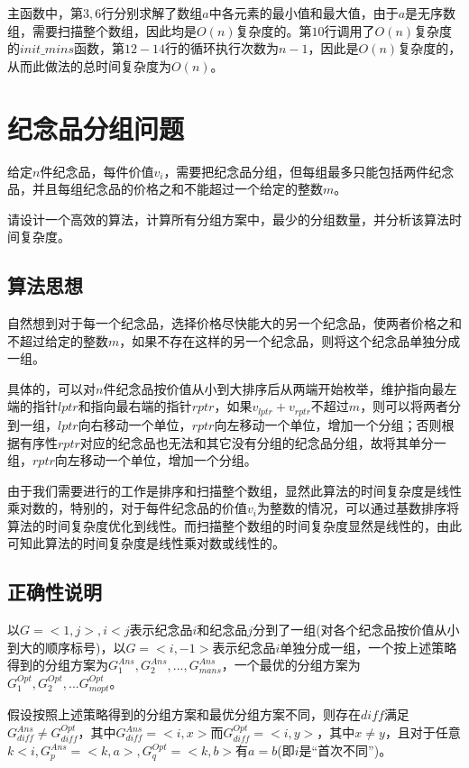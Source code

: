 \documentclass{article}
\begin{document}
主函数中，第$3,6$行分别求解了数组$a$中各元素的最小值和最大值，由于$a$是无序数组，需要扫描整个数组，因此均是$O(n)$复杂度的。第$10$行调用了$O(n)$复杂度的$init\_mins$函数，第$12-14$行的循环执行次数为$n-1$，因此是$O(n)$复杂度的，从而此做法的总时间复杂度为$O(n)$。

\section{纪念品分组问题}

给定$n$件纪念品，每件价值$v_i$，需要把纪念品分组，但每组最多只能包括两件纪念品，并且每组纪念品的价格之和不能超过一个给定的整数$m$。

请设计一个高效的算法，计算所有分组方案中，最少的分组数量，并分析该算法时间复杂度。

\subsection{算法思想}

自然想到对于每一个纪念品，选择价格尽快能大的另一个纪念品，使两者价格之和不超过给定的整数$m$，如果不存在这样的另一个纪念品，则将这个纪念品单独分成一组。

具体的，可以对$n$件纪念品按价值从小到大排序后从两端开始枚举，维护指向最左端的指针$lptr$和指向最右端的指针$rptr$，如果$v_{lptr}+v_{rptr}$不超过$m$，则可以将两者分到一组，$lptr$向右移动一个单位，$rptr$向左移动一个单位，增加一个分组；否则根据有序性$rptr$对应的纪念品也无法和其它没有分组的纪念品分组，故将其单分一组，$rptr$向左移动一个单位，增加一个分组。

由于我们需要进行的工作是排序和扫描整个数组，显然此算法的时间复杂度是线性乘对数的，特别的，对于每件纪念品的价值$v_i$为整数的情况，可以通过基数排序将算法的时间复杂度优化到线性。而扫描整个数组的时间复杂度显然是线性的，由此可知此算法的时间复杂度是线性乘对数或线性的。

\subsection{正确性说明}

以$G=<1,j>,i<j$表示纪念品$i$和纪念品$j$分到了一组(对各个纪念品按价值从小到大的顺序标号)，以$G=<i,-1>$表示纪念品$i$单独分成一组，一个按上述策略得到的分组方案为$G^{Ans}_1,G^{Ans}_2,...,G^{Ans}_{mans}$，一个最优的分组方案为$G^{Opt}_1,G^{Opt}_2,...G^{Opt}_{mopt}$。

假设按照上述策略得到的分组方案和最优分组方案不同，则存在$diff$满足$G^{Ans}_{diff}\ne{G}^{Opt}_{diff}$，其中$G^{Ans}_{diff}=<i,x>$而$G^{Opt}_{diff}=<i,y>$，其中$x\ne{y}$，且对于任意$k<i,G^{Ans}_{p}=<k,a>,G^{Opt}_{q}=<k,b>$有$a=b$(即$i$是“首次不同”)。
\end{document}
